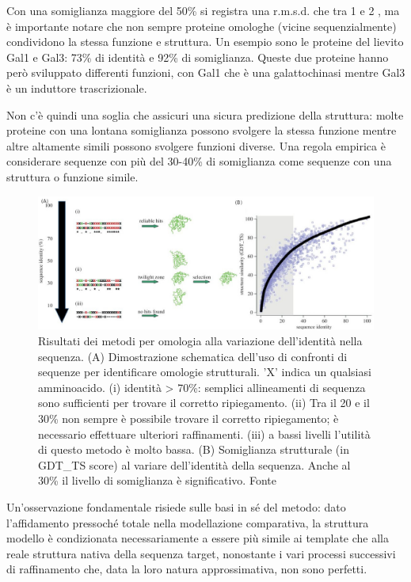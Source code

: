 Con una somiglianza maggiore del 50\% si registra una r.m.s.d. che tra 1 e 2 \angstrom, ma è importante notare che non sempre proteine omologhe (vicine sequenzialmente) condividono la stessa funzione e struttura. Un esempio sono le proteine del lievito Gal1 e Gal3: 73\% di identità e 92\% di somiglianza. Queste due proteine hanno però sviluppato differenti funzioni, con Gal1 che è una galattochinasi mentre Gal3 è un induttore trascrizionale\supercite{platt2000insertion}.

\par Non c'è quindi una soglia che assicuri una sicura predizione della struttura: molte proteine con una lontana somiglianza possono svolgere la stessa funzione mentre altre altamente simili possono svolgere funzioni diverse. Una regola empirica è considerare sequenze con più del 30-40\% di somiglianza come sequenze con una struttura o funzione simile.

\begin{figure}[!htb]
	\centering
	\includegraphics[scale=1.2]{images/homology-grafico.jpg}
	\caption{Risultati dei metodi per omologia alla variazione dell'identità nella sequenza. (A) Dimostrazione schematica dell'uso di confronti di sequenze per identificare omologie strutturali. 'X' indica un qualsiasi amminoacido. (i) identità > 70\%: semplici allineamenti di sequenza sono sufficienti per trovare il corretto ripiegamento. (ii) Tra il 20 e il 30\% non sempre è possibile trovare il corretto ripiegamento; è necessario effettuare ulteriori raffinamenti. (iii) a bassi livelli l'utilità di questo metodo è molto bassa. (B) Somiglianza strutturale (in GDT\_TS score) al variare dell'identità della sequenza. Anche al 30\% il livello di somiglianza è significativo. Fonte\cite{joseph2014local}}
	\label{fig:omologia-grafico}
\end{figure}

\par Un'osservazione fondamentale risiede sulle basi in sé del metodo: dato l'affidamento pressoché totale nella modellazione comparativa, la struttura modello è condizionata necessariamente a essere più simile ai template che alla reale struttura nativa della sequenza target, nonostante i vari processi successivi di raffinamento che, data la loro natura approssimativa, non sono perfetti. 

